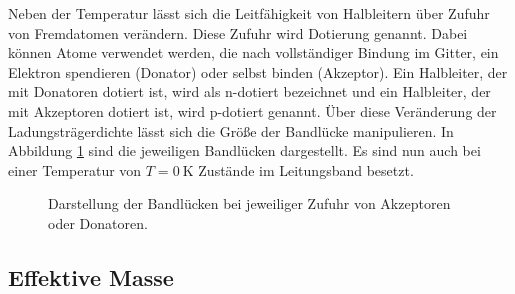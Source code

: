 Neben der Temperatur lässt sich die Leitfähigkeit von Halbleitern über Zufuhr von Fremdatomen verändern.
Diese Zufuhr wird Dotierung genannt.
Dabei können Atome verwendet werden, die nach vollständiger Bindung im Gitter, ein Elektron spendieren (Donator) oder selbst binden (Akzeptor). 
Ein Halbleiter, der mit Donatoren dotiert ist, wird als n-dotiert bezeichnet und ein Halbleiter, der mit Akzeptoren dotiert ist, wird p-dotiert genannt.
Über diese Veränderung der Ladungsträgerdichte lässt sich die Größe der Bandlücke manipulieren. 
In Abbildung \ref{fig:ak_don} sind die jeweiligen Bandlücken dargestellt.
Es sind nun auch bei einer Temperatur von $T=\SI{0}{\kelvin}$ Zustände im Leitungsband besetzt.

\begin{figure}[!ht]
    \centering
    \caption{Darstellung der Bandlücken bei jeweiliger Zufuhr von Akzeptoren oder Donatoren. \cite[S. 453]{Dem3}}
    \label{fig:ak_don}
\end{figure}


\subsection{Effektive Masse}

